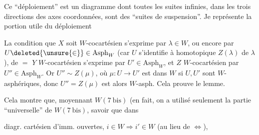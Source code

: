 
Ce ``déploiement'' est un diagramme  dont toutes les suites infinies, dans les trois directions des axes  coordonnées, sont des ``suites de suspension''. Je représente la portion utile du déploiement


La condition que $X$ soit $W$-cocartésien s'exprime par $\lambda\in W$, ou encore par $U\deleted{\unsure{\in}}\in\mathrm{Asph}_W$ (car $U$ s'identifie à   homotopique $Z(\lambda)$ de $\lambda$ \unsure{\ldots}), de $=$ $Y$ $W$-cocartésien s'exprime par $U'\in\mathrm{Asph}_W$, et $Z$ $W$-cocartésien par $U''\in\mathrm{Asph}_W$. Or $U''\sim Z(\mu)$, où $\mu:U\longrightarrow U'$ est dans $W$ si $U,U'$ sont $W$-asphériques, donc $U''=Z(\mu)$ est alors $W$-asph. Cela prouve le lemme.

Cela montre que, moyennant $W(7\ \mathrm{bis})$ (en fait, on a utilisé seulement la partie ``universelle'' de $W(7\ \mathrm{bis})$, savoir que dans


diagr. cartésien d'imm. ouvertes, $i\in W\Longrightarrow i'\in W$ (au lieu de $\Longleftrightarrow$),

